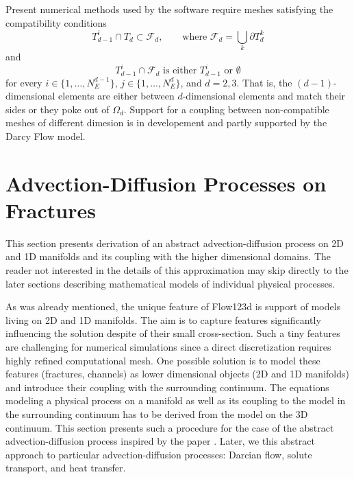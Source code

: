 \documentclass[12pt,a4paper]{report}
\begin{document}
Present numerical methods used by the software require meshes satisfying the compatibility conditions
\begin{equation}
        T_{d-1}^i \cap T_d \subset \mathcal{F}_d,   \qquad \text{where } \mathcal{F}_d = \bigcup_{k} \partial T_{d}^{k}
\end{equation}
and
\begin{equation}
        T_{d-1}^i \cap \mathcal{F}_d    \text{ is either $T_{d-1}^i$ or $\emptyset$}    
\end{equation}
for every $i\in\{1,\dots, N_{E}^{d-1}\}$, $j\in\{1,\dots,N_{E}^{d}\}$,  and $d=2,3$. 
That is, the $(d-1)$-dimensional elements are either between $d$-dimensional elements and
match their sides or they poke out of $\Omega_d$. Support for a coupling between non-compatible
meshes of different dimesion is in developement and partly supported by the Darcy Flow model.

\section{Advection-Diffusion Processes on Fractures}
\label{sc:ad_on_fractures}
This section presents derivation of an abstract advection-diffusion process on 2D and 1D manifolds and its coupling with
the higher dimensional domains. The reader not interested in the details of this approximation may skip directly to
the later sections describing mathematical models of individual physical processes.

As was already mentioned, the unique feature of Flow123d is support of models living on 2D and 1D manifolds. The aim is to capture 
features significantly influencing the solution despite of their small cross-section. Such a tiny features are
challenging for numerical simulations since a direct discretization requires highly refined
computational mesh. One possible solution is to model these features (fractures, channels) 
as lower dimensional objects (2D and 1D manifolds) and introduce their coupling with the surrounding continuum.
The equations modeling a physical process on a manifold as well as its coupling to the model in the surrounding continuum
has to be derived from the model on the 3D continuum. This section presents such a procedure for the case of the abstract
advection-diffusion process inspired by the paper \cite{martin_modeling_2005}. Later, we this abstract approach to 
particular advection-diffusion processes: Darcian flow, solute transport, and heat transfer.
\end{document}

